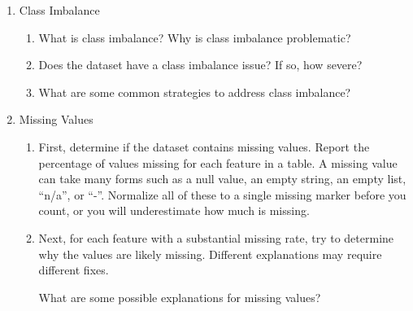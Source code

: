 \documentclass[12pt]{article}
\begin{document}
\begin{enumerate}
\begin{enumerate}
\item What should we do when exploring the distributions of the features?

\item Suppose a feature takes the same value for almost every respondent. Why is this
  feature worth finding, and what would you do about it?

 \item Suppose two features are highly correlated, such as two Likert questions that
   respondents tend to answer the same way. How would you test whether two features are
   highly correlated, and why does a highly correlated pair cause trouble?

\end{enumerate}

\item Class Imbalance

\begin{enumerate}

\item What is class imbalance? Why is class imbalance problematic?

\item Does the dataset have a class imbalance issue? If so, how severe?

\item What are some common strategies to address class imbalance?

\end{enumerate}

\item Missing Values

\begin{enumerate}

\item First, determine if the dataset contains missing values. Report the percentage of
  values missing for each feature in a table. A missing value can take many forms such
  as a null value, an empty string, an empty list, ``n/a'', or ``-''. Normalize all of
  these to a single missing marker before you count, or you will underestimate how much
  is missing.
\bigskip

\item Next, for each feature with a substantial missing rate, try to determine why the
  values are likely missing. Different explanations may require different fixes.

What are some possible explanations for missing values?

\bigskip


\end{enumerate}
\end{enumerate}
\end{document}
